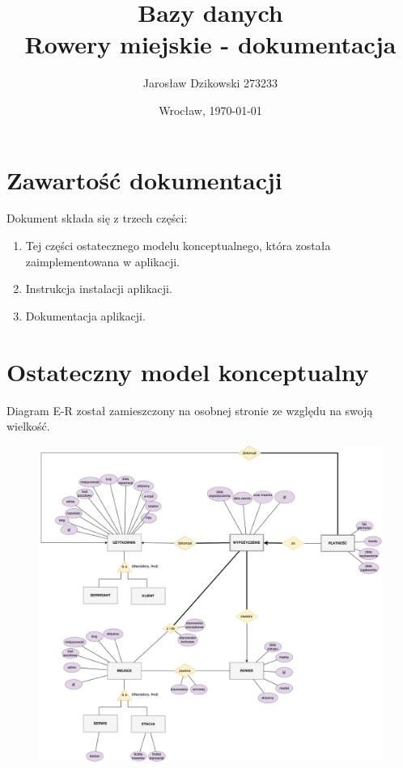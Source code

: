 \documentclass{article}
\author{Jarosław Dzikowski 273233}
\date{Wrocław, \today}
\title{\textbf{Bazy danych} \\ Rowery miejskie - dokumentacja}
\begin{document}
\maketitle

\section{Zawartość dokumentacji}
Dokument składa się z trzech części:
\begin{enumerate}
	\item Tej części ostatecznego modelu konceptualnego, która została zaimplementowana w aplikacji.
	\item Instrukcja instalacji aplikacji.
	\item Dokumentacja aplikacji.
\end{enumerate}

\section{Ostateczny model konceptualny}
Diagram E-R został zamieszczony na osobnej stronie ze względu na swoją wielkość.
\begin{figure}[p]
\centerline{	\includegraphics[width=\paperwidth, height=\paperheight, keepaspectratio]{conceptualmodel.pdf}}
\end{figure}
\end{document}

